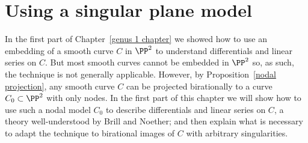 

\def\adj{{\mathfrak F}}
\chapter{Using a singular plane model}
\label{PlaneCurvesChapter}
\label{PlaneCurveChapter}

In the first part of Chapter~\ref{genus 1 chapter} we showed how to use an embedding of a smooth curve $C$
in $\PP^2$ to understand differentials and linear series on $C$. But most smooth curves cannot be embedded in
$\PP^2$ so, as such, the technique is not generally applicable. However, by Proposition~\ref{nodal projection},
 any smooth curve $C$ can be projected 
birationally to a curve $C_0\subset\PP^2$ with only nodes. In the first part of this chapter we will show
how to use such a nodal model $C_0$ to describe differentials and linear series on $C$, a theory well-understood
by Brill and Noether;  and then explain
what is necessary to adapt the technique to birational images of $C$ with arbitrary singularities.

